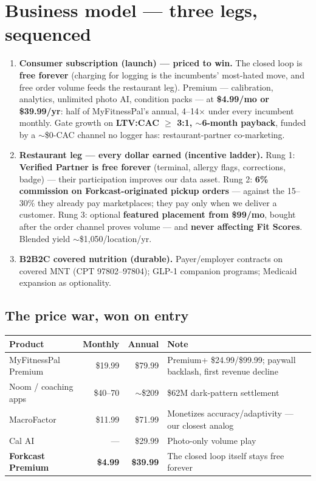 \documentclass[10pt]{article}
\begin{document}
\section{Business model --- three legs, sequenced}

\begin{enumerate}[leftmargin=1.4em,itemsep=3pt]
\item \textbf{Consumer subscription (launch) --- priced to win.} The closed loop is \textbf{free forever} (charging for logging is the incumbents' most-hated move, and free order volume feeds the restaurant leg). Premium --- calibration, analytics, unlimited photo AI, condition packs --- at \textbf{\$4.99/mo or \$39.99/yr}: half of MyFitnessPal's annual, 4--14$\times$ under every incumbent monthly. Gate growth on \textbf{LTV:CAC $\geq$ 3:1, $\sim$6-month payback}, funded by a $\sim$\$0-CAC channel no logger has: restaurant-partner co-marketing.
\item \textbf{Restaurant leg --- every dollar earned (incentive ladder).} Rung 1: \textbf{Verified Partner is free forever} (terminal, allergy flags, corrections, badge) --- their participation improves our data asset. Rung 2: \textbf{6\% commission on Forkcast-originated pickup orders} --- against the 15--30\% they already pay marketplaces; they pay only when we deliver a customer. Rung 3: optional \textbf{featured placement from \$99/mo}, bought after the order channel proves volume --- and \textbf{never affecting Fit Scores}. Blended yield $\sim$\$1{,}050/location/yr.
\item \textbf{B2B2C covered nutrition (durable).} Payer/employer contracts on covered MNT (CPT 97802--97804); GLP-1 companion programs; Medicaid expansion as optionality.
\end{enumerate}

\subsection*{The price war, won on entry}
\begin{tabularx}{\textwidth}{@{}l r r L@{}}
\toprule
\textbf{Product} & \textbf{Monthly} & \textbf{Annual} & \textbf{Note}\\
\midrule
MyFitnessPal Premium & \$19.99 & \$79.99 & Premium+ \$24.99/\$99.99; paywall backlash, first revenue decline\\
Noom / coaching apps & \$40--70 & $\sim$\$209 & \$62M dark-pattern settlement\\
MacroFactor & \$11.99 & \$71.99 & Monetizes accuracy/adaptivity --- our closest analog\\
Cal AI & --- & \$29.99 & Photo-only volume play\\
\textbf{Forkcast Premium} & \textbf{\$4.99} & \textbf{\$39.99} & The closed loop itself stays free forever\\
\bottomrule
\end{tabularx}
\end{document}
